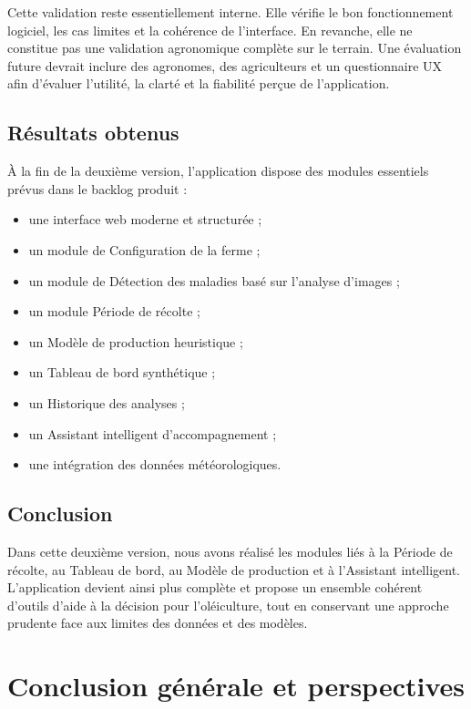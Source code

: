 \documentclass[12pt,a4paper]{report}
\begin{document}
Cette validation reste essentiellement interne. Elle vérifie le bon fonctionnement logiciel, les cas limites et la cohérence de l'interface. En revanche, elle ne constitue pas une validation agronomique complète sur le terrain. Une évaluation future devrait inclure des agronomes, des agriculteurs et un questionnaire UX afin d'évaluer l'utilité, la clarté et la fiabilité perçue de l'application.

\section{Résultats obtenus}

À la fin de la deuxième version, l'application dispose des modules essentiels prévus dans le backlog produit :

\begin{itemize}
    \item une interface web moderne et structurée ;
    \item un module de Configuration de la ferme ;
    \item un module de Détection des maladies basé sur l'analyse d'images ;
    \item un module Période de récolte ;
    \item un Modèle de production heuristique ;
    \item un Tableau de bord synthétique ;
    \item un Historique des analyses ;
    \item un Assistant intelligent d'accompagnement ;
    \item une intégration des données météorologiques.
\end{itemize}

\section{Conclusion}

Dans cette deuxième version, nous avons réalisé les modules liés à la Période de récolte, au Tableau de bord, au Modèle de production et à l'Assistant intelligent. L'application devient ainsi plus complète et propose un ensemble cohérent d'outils d'aide à la décision pour l'oléiculture, tout en conservant une approche prudente face aux limites des données et des modèles.

\chapter*{Conclusion générale et perspectives}
\end{document}
